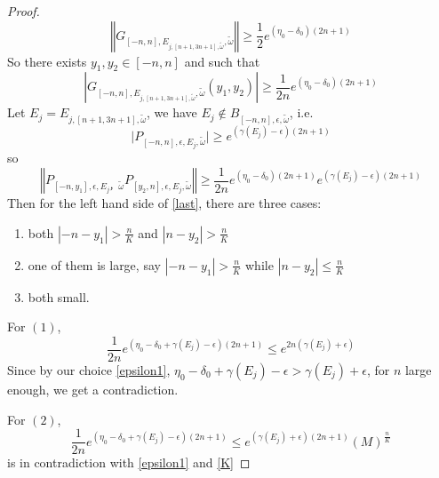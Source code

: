 \begin{proof}
\[
  \left\Vert G_{[-n,n],E_{j,[n+1,3n+1],\tilde{\omega}},\tilde{\omega}}\right\Vert\geq \frac{1}{2}e^{(\eta_0-\delta_0)(2n+1)}
\]
So there exists $ y_{1},y_{2}\in [-n,n]$ and such that
\[
  \left\vert G_{[-n,n],E_{j,[n+1,3n+1],\tilde{\omega}},\tilde{\omega}}(y_{1},y_{2})\right\vert\geq \frac{1}{2n}e^{(\eta_0-\delta_0)(2n+1)}
\]
Let $E_j=E_{j,[n+1,3n+1],\tilde{\omega}}$, we have $E_j\notin B_{[-n,n],\epsilon,\tilde{\omega}}$, i.e.
\[
\vert P_{[-n,n],\epsilon,E_j,\tilde{\omega}}\vert\geq e^{(\gamma(E_j)-\epsilon)(2n+1)}
\]
so
\begin{equation}\label{last}
  \left\Vert P_{[-n,y_{1}],\epsilon,E_j，\tilde{\omega}}P_{[y_{2},n],\epsilon,E_j,\tilde{\omega}}\right\Vert\geq\frac{1}{2n}e^{(\eta_0-\delta_0)(2n+1)}e^{(\gamma(E_j)-\epsilon)(2n+1)}
\end{equation}
Then for the left hand side of \eqref{last}, there are three cases:
\begin{enumerate}
  \item both $|-n-y_{1}|>\frac{n}{K}$ and $|n-y_{2}|>\frac{n}{K}$
  \item one of them is large, say $|-n-y_{1}|>\frac{n}{K}$ while $|n-y_{2}|\leq\frac{n}{K}$
  \item both small.
\end{enumerate}

For $(1)$,
\[
\frac{1}{2n}e^{(\eta_0-\delta_0+\gamma(E_j)-\epsilon)(2n+1)}\leq e^{2n(\gamma(E_j)+\epsilon)}
\]
Since by our choice \eqref{epsilon1},
 $\eta_0-\delta_0+\gamma(E_j)-\epsilon>\gamma(E_j)+\epsilon$, for $n$ large enough, we get a contradiction.

For $(2)$,
\[
    \frac{1}{2n}e^{(\eta_0-\delta_0+\gamma(E_j)-\epsilon)(2n+1)}
    \leq e^{(\gamma(E_j)+\epsilon)(2n+1)}(M)^{\frac{n}{K}}
\]
is in contradiction with \eqref{epsilon1} and \eqref{K}


\end{proof}

